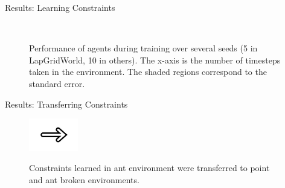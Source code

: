 \documentclass[t, pdf, aspectratio=169]{beamer}
\begin{document}
\begin{frame}[fragile]{Results: Learning Constraints}
\begin{figure}
\begin{center}
    \\
    \caption{\tiny{Performance of agents during training over several seeds (5 in LapGridWorld, 10 in others). The x-axis is the number of timesteps taken in the environment. The shaded regions correspond to the standard error.}}
    \label{fig:main_results}
\end{center}
\end{figure}
\end{frame}



\begin{frame}{Results: Transferring Constraints}
\begin{figure}
\vskip 0.4in
    {\label{fig:arrow}\includegraphics[width=0.19\textwidth]{figures/rightarrow.jpg}}
    \caption{Constraints learned in ant environment were transferred to point and ant broken environments.}
    \label{fig:envs2}
\vskip -0.2in
\end{figure}
\end{frame}
\end{document}
